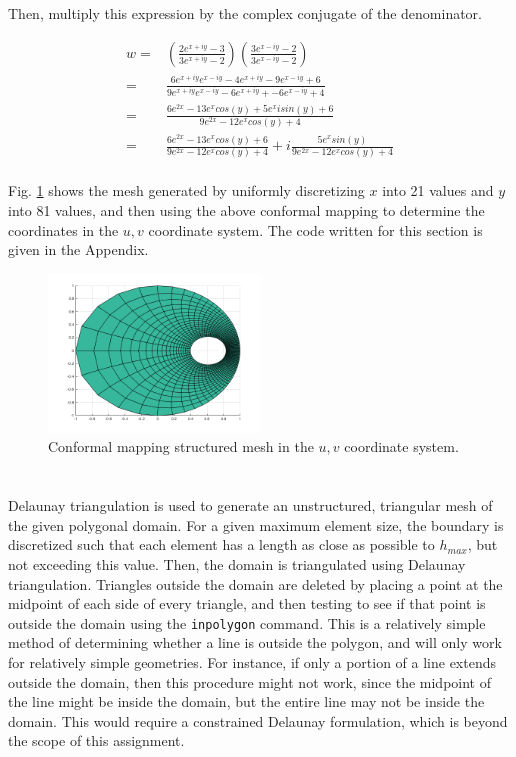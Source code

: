\documentclass[10pt]{article}
\begin{document}
Then, multiply this expression by the complex conjugate of the denominator. 

\begin{equation}
\begin{aligned}
w=& \left(\frac{2e^{x+iy}-3}{3e^{x+iy}-2}\right)\left(\frac{3e^{x-iy}-2}{3e^{x-iy}-2}\right)\\
=& \frac{6e^{x+iy}e^{x-iy}-4e^{x+iy}-9e^{x-iy}+6}{9e^{x+iy}e^{x-iy}-6e^{x+iy}+-6e^{x-iy}+4}\\
=& \frac{6e^{2x}-13e^xcos(y)+5e^xisin(y)+6}{9e^{2x}-12e^xcos(y)+4}\\
=& \frac{6e^{2x}-13e^xcos(y)+6}{9e^{2x}-12e^xcos(y)+4}+i\frac{5e^xsin(y)}{9e^{2x}-12e^xcos(y)+4}\\
\end{aligned}
\end{equation}

Fig. \ref{fig:q3} shows the mesh generated by uniformly discretizing \(x\) into 21 values and \(y\) into 81 values, and then using the above conformal mapping to determine the coordinates in the \(u, v\) coordinate system. The code written for this section is given in the Appendix.

\begin{figure}[H]
\centering
\includegraphics[width=0.5\textwidth]{Question3.png}
\caption{Conformal mapping structured mesh in the \(u, v\) coordinate system.}
\label{fig:q3}
\end{figure}

\section{}

Delaunay triangulation is used to generate an unstructured, triangular mesh of the given polygonal domain. For a given maximum element size, the boundary is discretized such that each element has a length as close as possible to \(h_{max}\), but not exceeding this value. Then, the domain is triangulated using Delaunay triangulation. Triangles outside the domain are deleted by placing a point at the midpoint of each side of every triangle, and then testing to see if that point is outside the domain using the {\tt inpolygon} command. This is a relatively simple method of determining whether a line is outside the polygon, and will only work for relatively simple geometries. For instance, if only a portion of a line extends outside the domain, then this procedure might not work, since the midpoint of the line might be inside the domain, but the entire line may not be inside the domain. This would require a constrained Delaunay formulation, which is beyond the scope of this assignment. 
\end{document}

